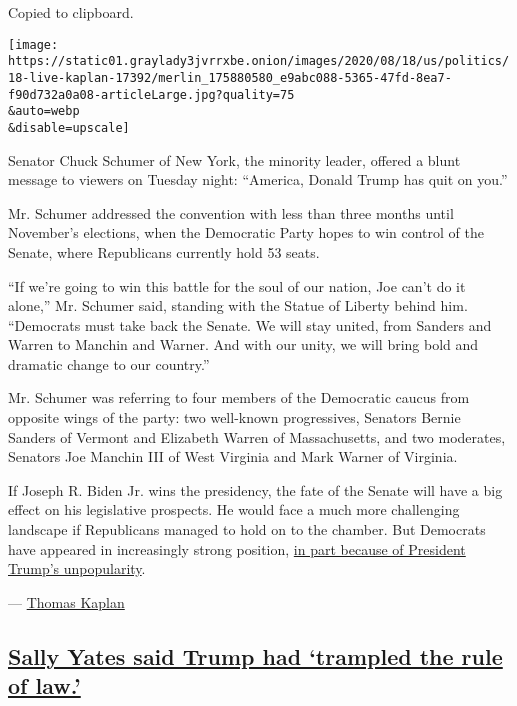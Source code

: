 Copied to clipboard.

\texttt{[image: https://static01.graylady3jvrrxbe.onion/images/2020/08/18/us/politics/18-live-kaplan-17392/merlin\_175880580\_e9abc088-5365-47fd-8ea7-f90d732a0a08-articleLarge.jpg?quality=75\\\&auto=webp\\\&disable=upscale]}

Senator Chuck Schumer of New York, the minority leader, offered a blunt
message to viewers on Tuesday night: ``America, Donald Trump has quit on
you.''

Mr. Schumer addressed the convention with less than three months until
November's elections, when the Democratic Party hopes to win control of
the Senate, where Republicans currently hold 53 seats.

``If we're going to win this battle for the soul of our nation, Joe
can't do it alone,'' Mr. Schumer said, standing with the Statue of
Liberty behind him. ``Democrats must take back the Senate. We will stay
united, from Sanders and Warren to Manchin and Warner. And with our
unity, we will bring bold and dramatic change to our country.''

Mr. Schumer was referring to four members of the Democratic caucus from
opposite wings of the party: two well-known progressives, Senators
Bernie Sanders of Vermont and Elizabeth Warren of Massachusetts, and two
moderates, Senators Joe Manchin III of West Virginia and Mark Warner of
Virginia.

If Joseph R. Biden Jr. wins the presidency, the fate of the Senate will
have a big effect on his legislative prospects. He would face a much
more challenging landscape if Republicans managed to hold on to the
chamber. But Democrats have appeared in increasingly strong position,
\href{https://www.nytimes3xbfgragh.onion/2020/06/25/us/politics/trump-senate-republicans-poll.html}{in
part because of President Trump's unpopularity}.

--- \href{https://www.nytimes3xbfgragh.onion/by/thomas-kaplan}{Thomas
Kaplan}

\hypertarget{sally-yates-said-trump-had-trampled-the-rule-of-law}{%
\subsection{\texorpdfstring{\protect\hyperlink{sally-yates-said-trump-had-trampled-the-rule-of-law}{Sally
Yates said Trump had `trampled the rule of
law.'}}{Sally Yates said Trump had `trampled the rule of law.'}}\label{sally-yates-said-trump-had-trampled-the-rule-of-law}}

